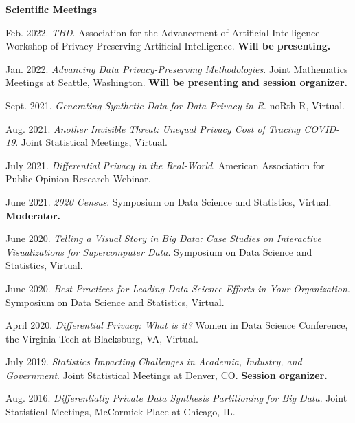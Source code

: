 \documentclass[11pt, letterpaper, roman]{moderncv} %
\begin{document}
\underline{\textbf{\large Scientific Meetings}}\normalsize
\vspace{6pt}
\begin{etaremune}[topsep=0pt, itemsep=6pt, partopsep=0pt, parsep=0pt]
    \item Feb. 2022. \textit{TBD}. Association for the Advancement of Artificial Intelligence Workshop of Privacy Preserving Artificial Intelligence. \textbf{Will be presenting.}
    
    \item Jan. 2022. \textit{Advancing Data Privacy-Preserving Methodologies}. Joint Mathematics Meetings at Seattle, Washington. \textbf{Will be presenting and session organizer.}
    
    \item Sept. 2021. \textit{Generating Synthetic Data for Data Privacy in R}. noRth R, Virtual.

    \item Aug. 2021. \textit{Another Invisible Threat: Unequal Privacy Cost of Tracing COVID-19}. Joint Statistical Meetings, Virtual.
    
    \item July 2021. \textit{Differential Privacy in the Real-World}. American Association for Public Opinion Research Webinar.
    
    \item June 2021. \textit{2020 Census}. Symposium on Data Science and Statistics, Virtual. \textbf{Moderator.}

    \item June 2020. \textit{Telling a Visual Story in Big Data: Case Studies on Interactive Visualizations for Supercomputer Data}. Symposium on Data Science and Statistics, Virtual.
  
    \item June 2020. \textit{Best Practices for Leading Data Science Efforts in Your Organization}. Symposium on Data Science and Statistics, Virtual.
  
    \item April 2020. \textit{Differential Privacy: What is it?} Women in Data Science Conference, the Virginia Tech at Blacksburg, VA, Virtual.

    \item July 2019. \textit{Statistics Impacting Challenges in Academia, Industry, and Government}. Joint Statistical Meetings at Denver, CO. \textbf{Session organizer.}

    \item Aug. 2016. \textit{Differentially Private Data Synthesis Partitioning for Big Data}. Joint Statistical Meetings, McCormick Place at Chicago, IL.
    

\end{etaremune}
\end{document}
